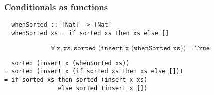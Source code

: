 \documentclass[serif,professionalfont]{beamer}
\newcommand\faa[2]{ \forall \, #1 , #2 . \,}
\newcommand\hs[1]{\texttt{#1}}
\newcommand\xs[0]{\hs{xs}}
\begin{document}
\begin{frame}[fragile]
  \frametitle{Conditionals as functions}

  \sortedprop

\begin{verbatim}
  whenSorted :: [Nat] -> [Nat]
  whenSorted xs = if sorted xs then xs else []
\end{verbatim}

  \begin{equation*}
    \faa{\hs{x}}{\xs} \hs{sorted (insert x (whenSorted xs))} = \hs{True}
  \end{equation*}

\begin{verbatim}
  sorted (insert x (whenSorted xs))
= sorted (insert x (if sorted xs then xs else []))
= if sorted xs then sorted (insert x xs)
               else sorted (insert x [])
\end{verbatim}
\end{frame}
\end{document}
